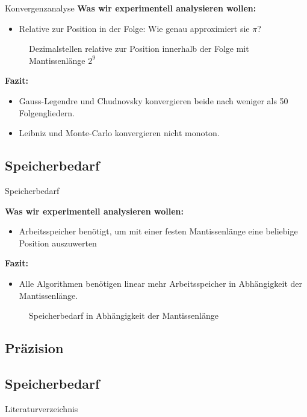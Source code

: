 \documentclass[9pt, t]{beamer}
\begin{document}
\begin{frame}{Konvergenzanalyse}
    \small
    \textbf{Was wir experimentell analysieren wollen:}
    \pause
    \begin{itemize}
        \item Relative zur Position in der Folge: Wie genau approximiert sie
              \(\pi\)?
    \end{itemize}
    \begin{figure}[H]
        \centering
        \subfloat{%
            
        }
        \subfloat{%
            
        }
        \caption{%
            Dezimalstellen relative zur Position innerhalb der Folge mit Mantissenlänge \(2^9\)
        }
    \end{figure}
    \pause
    \textbf{Fazit:}
    \begin{itemize}
        \item Gauss-Legendre und Chudnovsky konvergieren beide nach weniger als
              50 Folgengliedern.
        \item Leibniz und Monte-Carlo konvergieren nicht monoton.
    \end{itemize}
\end{frame}

\subsection{Speicherbedarf}

\begin{frame}{Speicherbedarf}
    \begin{minipage}{0.6\textwidth}
        \textbf{Was wir experimentell analysieren wollen:}
        \pause
        \begin{itemize}
            \item Arbeitsspeicher benötigt, um mit einer festen Mantissenlänge
                  eine beliebige Position auszuwerten
        \end{itemize}
        \pause
        \textbf{Fazit:}
        \begin{itemize}
            \item Alle Algorithmen benötigen linear mehr Arbeitsspeicher in
                  Abhängigkeit der Mantissenlänge.
        \end{itemize}
    \end{minipage}
    \hfill
    \begin{minipage}{0.39\textwidth}
        \begin{figure}[H]
            \centering
            
            \caption{Speicherbedarf in Abhängigkeit der Mantissenlänge}
        \end{figure}
    \end{minipage}
\end{frame}

\subsection{Präzision}

\subsection{Speicherbedarf}

\begin{frame}{Literaturverzeichnis}
    \printbibliography
\end{frame}
\end{document}
